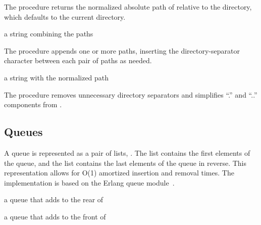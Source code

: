 The  procedure returns the normalized absolute path of 
relative to the  directory, which defaults to the current directory.

\begin{procedure}
\end{procedure}
\returns{} a string combining the paths

The  procedure appends one or more paths, inserting
the directory-separator character between each pair of paths as
needed.

\begin{procedure}
\end{procedure}
\returns{} a string with the normalized path

The  procedure removes unnecessary directory separators and
simplifies ``.'' and ``..'' components from .

\subsection {Queues}

A queue is represented as a pair of lists,
. The  list contains the first
elements of the queue, and the  list contains the last
elements of the queue in reverse. This representation allows for O(1)
amortized insertion and removal times. The implementation is based on
the Erlang queue module~\cite{queue-ref}.

\begin{procedure}
\end{procedure}
\returns{} a queue that adds  to the rear of 

\begin{procedure}
\end{procedure}
\returns{} a queue that adds  to the front of 

